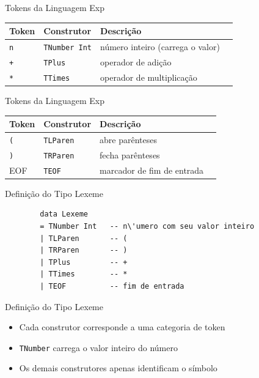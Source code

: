 \begin{frame}[fragile]{Tokens da Linguagem Exp}

    \begin{table}
        \begin{tabular}{l l l l}
            \hline
            Token & Construtor & Descrição \\
            \hline
            \texttt{n} & \texttt{TNumber Int} &
            número inteiro (carrega o valor) \\
            \texttt{+} & \texttt{TPlus} & operador
            de adição \\
            \texttt{*} & \texttt{TTimes} &
            operador de multiplicação \\
            \hline
        \end{tabular}
    \end{table}
\end{frame}

\begin{frame}[fragile]{Tokens da Linguagem Exp}

    \begin{table}
        \begin{tabular}{l l l l}
            \hline
            Token & Construtor & Descrição \\
            \hline
            \texttt{(} & \texttt{TLParen} & abre
            parênteses \\
            \texttt{)} & \texttt{TRParen} & fecha
            parênteses \\
            EOF & \texttt{TEOF} & marcador de fim de entrada \\
            \hline
        \end{tabular}
    \end{table}
\end{frame}

\begin{frame}[fragile]{Definição do Tipo Lexeme}

    \begin{lstlisting}
        data Lexeme
        = TNumber Int   -- n\'umero com seu valor inteiro
        | TLParen       -- (
        | TRParen       -- )
        | TPlus         -- +
        | TTimes        -- *
        | TEOF          -- fim de entrada
    \end{lstlisting}
\end{frame}

\begin{frame}[fragile]{Definição do Tipo Lexeme}

    \begin{itemize}

        \item
        Cada construtor corresponde a uma categoria de token
        \item
        \texttt{TNumber} carrega o valor inteiro do número
        \item
        Os demais construtores apenas identificam o símbolo
    \end{itemize}
\end{frame}


